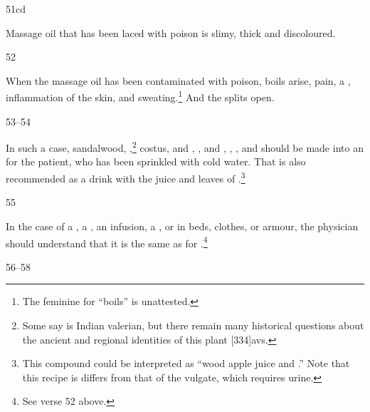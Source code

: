 \begin{translation}
\item[51cd]

Massage oil that has been laced with poison is slimy, thick and discoloured.   

\item[52]

When the massage oil has been contaminated with poison, boils arise, pain, a 
, inflammation of the
skin, and sweating.\footnote{The feminine  for “boils” is 
unattested.} And the  splits open.

\item[53--54]

In such a case, sandalwood, ,\footnote{Some say
 is Indian valerian, but there remain many historical questions about
the ancient and regional identities of this plant \citep[see, e.g., 
][173-174]{sing-1972}[334]{avs}.} costus, and 
, 
, 
and 
, 
, 
, and 
 should be made into an
 for the patient, who has been sprinkled with cold 
water.
That is also recommended as a drink with the juice and leaves of
.\footnote{This compound could be interpreted as 
“wood
apple juice and .”  Note that this recipe is differs
from that of the vulgate, which requires urine.}
 
 \item[55]
 
In the case of a , a , an infusion, a
, or in beds, clothes, or armour, the physician 
should understand that it is the same as for 
.\footnote{See verse 52 above.}
 
 \item[56--58]
 

\end{translation}
